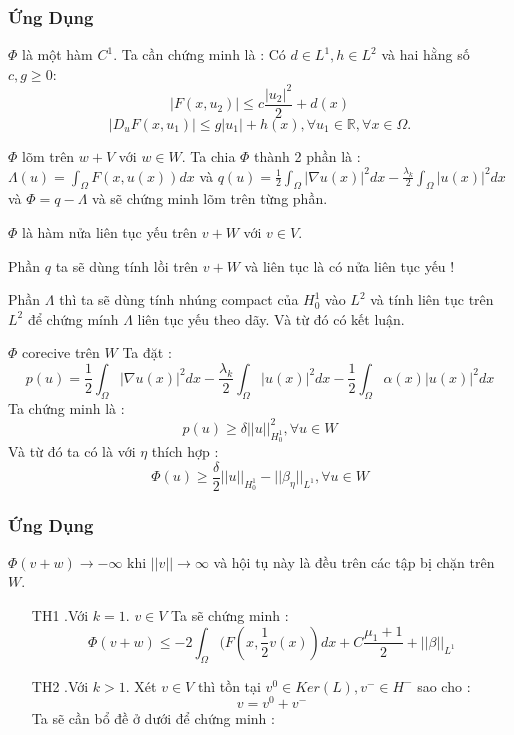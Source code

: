 \documentclass{beamer}
\begin{document}
\begin{frame}
\frametitle{Ứng Dụng}
\begin{block}{$\Phi$ là một hàm $C^1$.}
Ta cần chứng minh là : Có $d\in L^1,h\in L^2$ và hai hằng số $c,g\geq 0$:
$$|F(x,u_2)|\leq c\frac{|u_2|^2}{2}+d(x)$$
$$|D_uF(x,u_1)|\leq g|u_1|+h(x),\forall u_1\in \mathbb{R},\forall x\in \Omega.$$
\end{block}
\begin{block}{$\Phi$ lõm trên $w+V$ với $w\in W$.}
Ta chia $\Phi$ thành 2 phần là : $\Lambda(u)=\int_{\Omega}F(x,u(x))dx$ và $q(u)=\frac{1}{2}\int_{\Omega}|\nabla u(x)|^2dx-\frac{\lambda_k}{2}\int _{\Omega} |u(x)|^2dx$ và $\Phi=q-\Lambda$ và sẽ chứng minh lõm trên từng phần.
\end{block}
\end{frame}

\begin{frame}
\begin{block}{$\Phi$ là hàm nửa liên tục yếu trên $v+W$ với $v\in V$.}

Phần $q$ ta sẽ dùng tính lồi trên $v+W$ và liên tục là có nửa liên tục yếu !

Phần $\Lambda$ thì ta sẽ dùng tính nhúng compact của $H^1_0$ vào $L^2$ và tính liên tục trên $L^2$ để chứng mính $\Lambda$ liên tục yếu theo dãy. Và từ đó có kết luận.

\end{block}
\begin{block}{$\Phi$ corecive trên $W$}
Ta đặt :$$p(u)=\frac{1}{2}\int_{\Omega}|\nabla u(x)|^2dx-\frac{\lambda_k}{2}\int _{\Omega} |u(x)|^2dx-\frac{1}{2}\int_{\Omega}\alpha(x)|u(x)|^2dx$$
Ta chứng minh là :$$p(u)\geq \delta ||u||^2_{H^1_0},\forall u\in W$$
Và từ đó ta có là với $\eta$ thích hợp :$$\Phi(u)\geq \frac{\delta}{2}||u||_{H^1_0}-||\beta_{\eta}||_{L^1},\forall u\in W$$
\end{block}
\end{frame}

\begin{frame}
\frametitle{Ứng Dụng}
\begin{block}{$\Phi(v+w)\rightarrow -\infty$ khi $||v||\rightarrow \infty$ và hội tụ này là đều trên các tập bị chặn trên $W$.}
\begin{itemize}
\item[TH1].Với $k=1$. $v\in V$ Ta sẽ chứng minh :
$$\Phi(v+w)\leq -2 \int_{\Omega}(F(x,\frac{1}{2} v(x))dx+C\frac{\mu_1+1}{2}+||\beta||_{L^1}$$
\item[TH2].Với $k>1$. Xét $v\in V$ thì tồn tại $v^0\in Ker(L),v^{-}\in H^{-}$ sao cho : $$v=v^0+v^{-}$$
Ta sẽ cần bổ đề ở dưới để chứng minh :
\end{itemize}
\end{block}
\end{frame}
\end{document}
